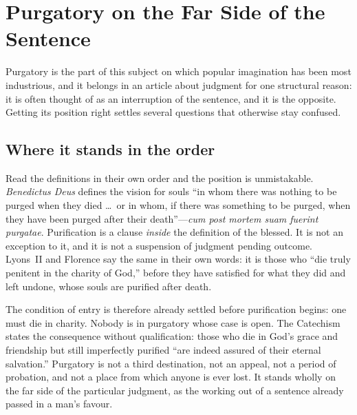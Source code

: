 \section{Purgatory on the Far Side of the Sentence}\label{sec:purgatory}

Purgatory is the part of this subject on which popular imagination has been most industrious, and it belongs in an article about judgment for one structural reason: it is often thought of as an interruption of the sentence, and it is the opposite. Getting its position right settles several questions that otherwise stay confused.

\subsection{Where it stands in the order}

Read the definitions in their own order and the position is unmistakable. \emph{Benedictus Deus} defines the vision for souls ``in whom there was nothing to be purged when they died \ldots\ or in whom, if there was something to be purged, when they have been purged after their death''---\emph{cum post mortem suam fuerint purgatae}. Purification is a clause \emph{inside} the definition of the blessed. It is not an exception to it, and it is not a suspension of judgment pending outcome. Lyons~II and Florence say the same in their own words: it is those who ``die truly penitent in the charity of God,'' before they have satisfied for what they did and left undone, whose souls are purified after death.

The condition of entry is therefore already settled before purification begins: one must die in charity. Nobody is in purgatory whose case is open. The Catechism states the consequence without qualification: those who die in God's grace and friendship but still imperfectly purified ``are indeed assured of their eternal salvation.'' Purgatory is not a third destination, not an appeal, not a period of probation, and not a place from which anyone is ever lost. It stands wholly on the far side of the particular judgment, as the working out of a sentence already passed in a man's favour.

